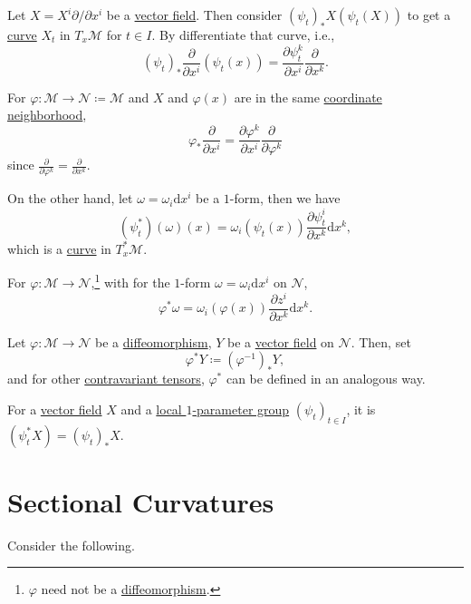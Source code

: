 Let \(X = X^i \partial /\partial x^i\) be a \hyperref[def:vector-field]{vector field}. Then consider \((\psi _t)_{\ast}X(\psi _t (X))\) to get a \hyperref[def:curve]{curve} \(X_t\) in \(T_x \mathcal{M} \) for \(t\in I\). By differentiate that curve, i.e.,
\[
	(\psi _t)_{\ast} \frac{\partial }{\partial x^i} (\psi _t(x))
	= \frac{\partial \psi _t^k}{\partial x^i} \frac{\partial }{\partial x^k}.
\]

\begin{note}
	For \(\varphi \colon \mathcal{M} \to \mathcal{N} \coloneqq \mathcal{M} \) and \(X\) and \(\varphi (x)\) are in the same \hyperref[def:local-coordinate]{coordinate neighborhood},
	\[
		\varphi _{\ast} \frac{\partial }{\partial x^i} = \frac{\partial \varphi ^k}{\partial x^i} \frac{\partial }{\partial \varphi ^k}
	\]
	since \(\frac{\partial }{\partial \varphi ^k} = \frac{\partial }{\partial x^k}\).
\end{note}

On the other hand, let \(\omega = \omega _i \mathrm{d} x^i\) be a \(1\)-form, then we have
\[
	(\psi ^{\ast} _t)(\omega )(x) = \omega _i (\psi _t(x))\frac{\partial \psi _t^i}{\partial x^k} \mathrm{d} x^k,
\]
which is a \hyperref[def:curve]{curve} in \(T_x^{\ast} \mathcal{M} \).

\begin{note}
	For \(\varphi \colon \mathcal{M} \to \mathcal{N} \),\footnote{\(\varphi \) need not be a \hyperref[def:diffeomorphism]{diffeomorphism}.} with for the \(1\)-form \(\omega = \omega_i \mathrm{d} x^i\) on \(\mathcal{N} \),
	\[
		\varphi ^{\ast} \omega = \omega _i (\varphi (x))\frac{\partial z^i}{\partial x^k} \mathrm{d} x^k.
	\]
\end{note}

Let \(\varphi \colon \mathcal{M} \to \mathcal{N} \) be a \hyperref[def:diffeomorphism]{diffeomorphism}, \(Y\) be a \hyperref[def:vector-field]{vector field} on \(\mathcal{N} \). Then, set
\[
	\varphi ^{\ast} Y\coloneqq (\varphi ^{-1} )_\ast Y,
\]
and for other \hyperref[def:tensor]{contravariant tensors}, \(\varphi ^{\ast} \) can be defined in an analogous way.

\begin{eg}
	For a \hyperref[def:vector-field]{vector field} \(X\) and a \hyperref[def:local-1-parameter-group]{local \(1\)-parameter group} \((\psi _t)_{t\in I}\), it is \((\psi _t ^{\ast} X)= (\psi _t)_\ast X\).
\end{eg}

\section{Sectional Curvatures}
Consider the following.

